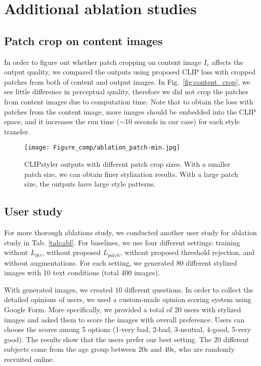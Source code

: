 \documentclass[10pt,twocolumn,letterpaper]{article}
\begin{document}
\section{Additional ablation studies}
\subsection{Patch crop on content images}
In order to figure out whether patch cropping on content image $I_c$ affects the output quality, we compared the outputs using proposed CLIP loss with cropped patches from both of content and output images. In Fig.~\ref{fig:content_crop}, we see little difference in perceptual quality, therefore we did not crop the patches from content images due to computation time. 
Note that  to obtain the loss with patches from the content image, more images should be embedded into the CLIP space, and it increases the run time ($\sim$10 seconds in our case) for each style transfer.



\begin{figure*}[!t]


\centering
\texttt{[image: Figure\_comp/ablation\_patch-min.jpg]}
\caption{CLIPstyler outputs with different patch crop sizes. With a smaller patch size, we can obtain finer stylization results. With a large patch size, the outputs have large style patterns. 
}
\label{fig:patch}
\end{figure*}

\subsection{User study}
For more thorough ablations study, we conducted another user study for ablation study in Tab. \ref{tab:abl}. For baselines, we use four different settings: training without $L_{dir}$, without proposed $L_{patch}$, without proposed threshold rejection, and without augmentations. For each setting, we generated 80 different stylized images with 10 text conditions (total 400 images). 

With generated images, we created 10 different questions. In order to collect the detailed opinions of users, we used a custom-made opinion scoring system using Google Form. More specifically, we provided a total of 20 users with stylized images and asked them to score the images with overall preference. Users can choose the scores among 5 options (1-very bad, 2-bad, 3-neutral, 4-good, 5-very good). The results show that the users prefer our best setting. The 20 different subjects come from the age group between 20s and 40s, who are randomly recruited online.
\end{document}
